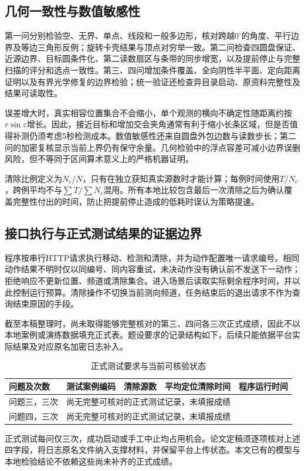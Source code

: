 \subsection{几何一致性与数值敏感性}
第一问分别检验空、无界、单点、线段和一般多边形，核对跨越$0^\circ$的角度、平行边界及等边三角形反例；旋转卡壳结果与顶点对穷举一致。第二问检查四圆盘保证、近源边界、目标圆条件化、第二读数扇区与条带的同步增宽，以及提前停止与完整扫描的评分和选点一致性。第三、四问增加条件覆盖、全向阴性半平面、定向距离证明以及有界光学修复的边界检验；统一验证还检查异目录启动、原资料完整性及结果可读取性。

误差增大时，真实相容位置集合不会缩小，单个观测的横向不确定性随距离约按$r\sin\varepsilon$增长。因此，接近目标和增加交会夹角通常有利于缩小长条区域，但是否值得补测仍须考虑5秒检测成本。数值敏感性还来自圆盘外包边数与读数步长；第二问的加密复核显示当前上界仍有保守余量。几何检验中的浮点容差可减小边界误删风险，但不等同于区间算术意义上的严格机器证明。

清除比例定义为$N_c/N$，只有在独立获知真实源数时才能计算；每例时间使用$T/N_c$，跨例平均不与$\sum T/\sum N_c$混用。所有本地比较包含最后一次清除之后为确认覆盖完整性付出的时间，防止把提前停止造成的低耗时误认为策略提速。

\subsection{接口执行与正式测试结果的证据边界}
程序按串行HTTP请求执行移动、检测和清除，并为动作配置唯一请求编号。相同动作结果不明时仅以同编号、同内容重试，未决动作没有确认前不发送下一动作；拒绝响应不更新位置、频道或清除集合。进入场景后读取实际剩余程序时间，并以此控制运行预算。清除操作不切换当前测向频道，任务结束后的退出请求不作为查询结束原因的手段。

截至本稿整理时，尚未取得能够完整核对的第三、四问各三次正式成绩，因此不以本地案例或演练数据填充正式表。题设要求的记录结构如下，后续只能依据平台实际结果及对应原名加密日志补入。
\begin{table}[htbp]
\centering\small
\caption{正式测试要求与当前可核验状态}
\begin{tabularx}{\textwidth}{lXXXX}
\toprule
问题及次数 & 测试案例编码 & 清除源数 & 平均定位清除时间 & 程序运行时间\\
\midrule
问题三，三次 & \multicolumn{4}{l}{尚无完整可核对的正式测试记录，未填报成绩}\\
问题四，三次 & \multicolumn{4}{l}{尚无完整可核对的正式测试记录，未填报成绩}\\
\bottomrule
\end{tabularx}
\end{table}
正式测试每问仅三次，成功启动或手工中止均占用机会。论文定稿须逐项核对上述四字段，将日志原名文件纳入支撑材料，并保留平台上传状态。本文已有的模型与本地检验结论不依赖这些尚未补齐的正式成绩。

